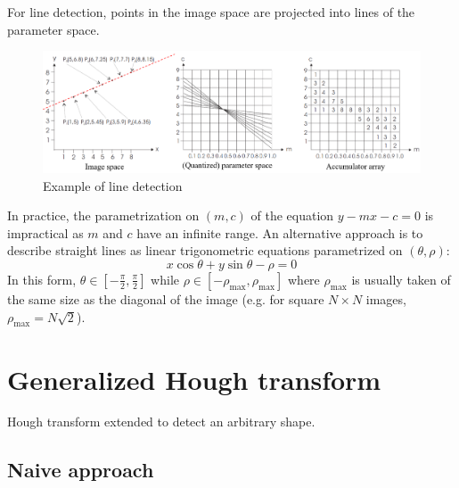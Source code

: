 For line detection, points in the image space are projected into lines of the parameter space.

\begin{figure}[H]
    \centering
    \includegraphics[width=0.85\linewidth]{./img/hough_line_detection.png}
    \caption{Example of line detection}
\end{figure}

In practice, the parametrization on $(m, c)$ of the equation $y-mx-c = 0$ is impractical as $m$ and $c$ have an infinite range.
An alternative approach is to describe straight lines as linear trigonometric equations parametrized on $(\theta, \rho)$:
\[ x \cos \theta + y \sin \theta - \rho = 0 \]
In this form, $\theta \in [ -\frac{\pi}{2}, \frac{\pi}{2} ]$ while $\rho \in [-\rho_\text{max}, \rho_\text{max}]$
where $\rho_\text{max}$ is usually taken of the same size as the diagonal of the image (e.g. for square $N \times N$ images, $\rho_\text{max} = N\sqrt{2}$).



\section{Generalized Hough transform}

Hough transform extended to detect an arbitrary shape.


\subsection{Naive approach}

